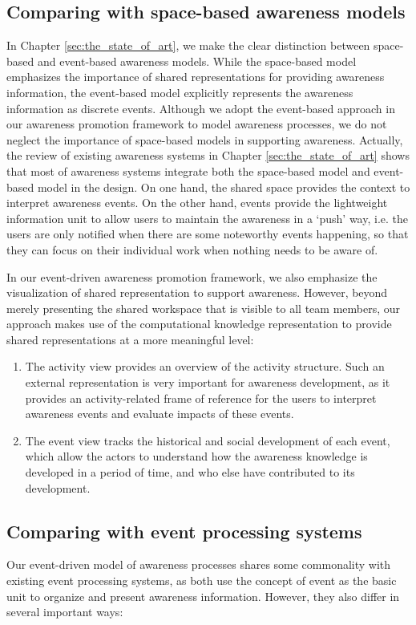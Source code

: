 \subsection{Comparing with space-based awareness models} %
\label{sub:comparing_with_space_based_awareness_models}
In Chapter \ref{sec:the_state_of_art}, we make the clear distinction between space-based and event-based awareness models. While the space-based model emphasizes the importance of shared representations for providing awareness information, the event-based model explicitly represents the awareness information as discrete events. Although we adopt the event-based approach in our awareness promotion framework to model  awareness processes, we do not neglect the importance of space-based models in supporting awareness. Actually, the review of existing awareness systems in Chapter \ref{sec:the_state_of_art} shows that most of awareness systems integrate both the space-based model and event-based model in the design. On one hand, the shared space provides the context to interpret awareness events. On the other hand, events provide the lightweight information unit to allow users to maintain the awareness in a `push' way, i.e. the users are only notified when there are some noteworthy events happening, so that they can focus on their individual work when nothing needs to be aware of.

In our event-driven awareness promotion framework, we also emphasize the visualization of shared representation to support awareness. However, beyond merely presenting the shared workspace that is visible to all team members, our approach makes use of the computational knowledge representation to provide shared representations at a more meaningful level:

\begin{enumerate}
	\item The activity view provides an overview of the activity structure. Such an external representation is very important for awareness development, as it provides an activity-related frame of reference for the users to interpret awareness events and evaluate impacts of these events.
	\item The event view tracks the historical and social development of each event, which allow the actors to understand how the awareness knowledge is developed in a period of time, and who else have contributed to its development.
\end{enumerate}
\subsection{Comparing with event processing systems} %
\label{sub:comparing_with_event_processing_systems}
Our event-driven model of awareness processes shares some commonality with existing event processing systems, as both use the concept of event as the basic unit to organize and present awareness information. However, they also differ in several important ways:

